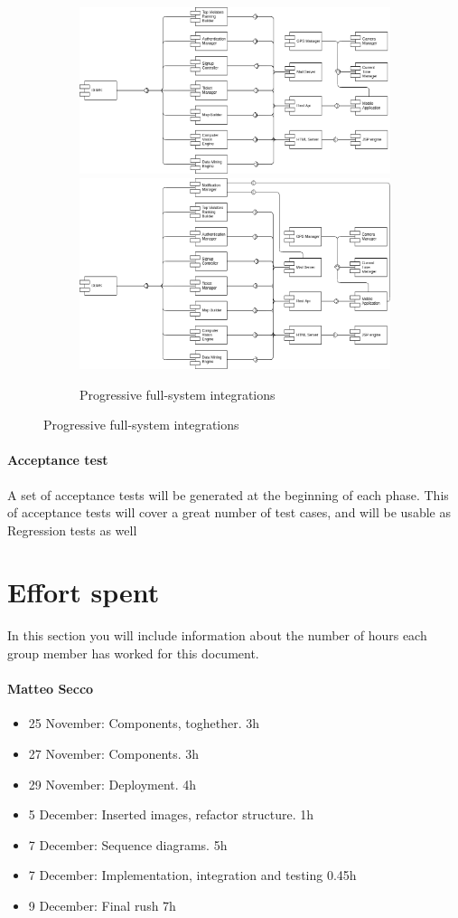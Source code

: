 \documentclass{article}
\begin{document}
\begin{figure}[h]
\begin{subfigure}[H]{\linewidth}
			\includegraphics[width=.49\linewidth]{images/integration_extended_6.png}
			\includegraphics[width=.6\linewidth]{images/integration_extended_8.png}
			\caption{Progressive full-system integrations}
		\end{subfigure}
	\end{figure}

\paragraph{Acceptance test} A set of acceptance tests will be generated at the beginning of each phase. This of acceptance tests will cover a great number of test cases, and will be usable as Regression tests as well

\section{Effort spent}In	 this	 section	you	will	include	information	about	 the	number	of	hours	each	
group	member	has	worked	for	this	document.
	\paragraph{Matteo Secco}
		\begin{itemize}
			\item 25 November: Components, toghether. 3h
			\item 27 November: Components. 3h
			\item 29 November: Deployment. 4h
			\item 5 December: Inserted images, refactor structure. 1h
			\item 7 December: Sequence diagrams. 5h
			\item 7 December: Implementation, integration and testing 0.45h
			\item 9 December: Final rush 7h
		\end{itemize}
\end{document}
